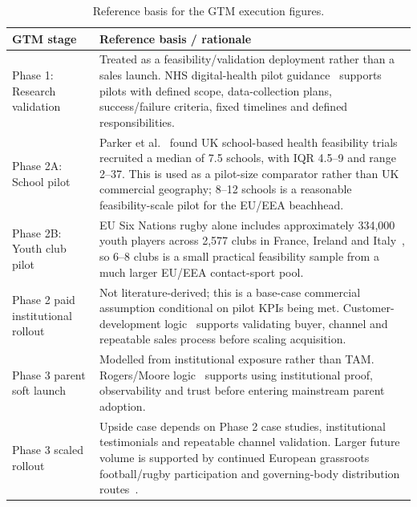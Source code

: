 \begin{table}[htbp]
    \centering
    \footnotesize
    \caption{Reference basis for the GTM execution figures.}
    \label{tab:ent-gtm-execution-rationale}
    \begin{tabular}{p{3.7cm}p{11.3cm}}
        \toprule
        \textbf{GTM stage} & \textbf{Reference basis / rationale} \\
        \midrule
        Phase 1: Research validation & Treated as a feasibility/validation deployment rather than a sales launch. NHS digital-health pilot guidance~\cite{ohid2020digitalhealth} supports pilots with defined scope, data-collection plans, success/failure criteria, fixed timelines and defined responsibilities. \\
        Phase 2A: School pilot & Parker et al.~\cite{parker2022schoolfeasibility} found UK school-based health feasibility trials recruited a median of 7.5 schools, with IQR 4.5--9 and range 2--37. This is used as a pilot-size comparator rather than UK commercial geography; 8--12 schools is a reasonable feasibility-scale pilot for the EU/EEA beachhead. \\
        Phase 2B: Youth club pilot & EU Six Nations rugby alone includes approximately 334,000 youth players across 2,577 clubs in France, Ireland and Italy~\cite{worldrugby2020participationmap}, so 6--8 clubs is a small practical feasibility sample from a much larger EU/EEA contact-sport pool. \\
        Phase 2 paid institutional rollout & Not literature-derived; this is a base-case commercial assumption conditional on pilot KPIs being met. Customer-development logic~\cite{blank2013startup} supports validating buyer, channel and repeatable sales process before scaling acquisition. \\
        Phase 3 parent soft launch & Modelled from institutional exposure rather than TAM. Rogers/Moore logic~\cite{rogers2003diffusion,moore1991chasm} supports using institutional proof, observability and trust before entering mainstream parent adoption. \\
        Phase 3 scaled rollout & Upside case depends on Phase 2 case studies, institutional testimonials and repeatable channel validation. Larger future volume is supported by continued European grassroots football/rugby participation and governing-body distribution routes~\cite{uefa2025schools,worldrugby2020participationmap}. \\
        \bottomrule
    \end{tabular}
\end{table}

